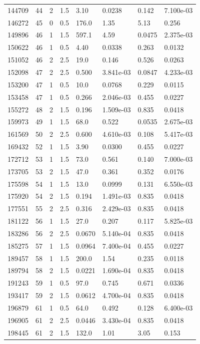 \documentclass[preview]{standalone}
\begin{document}
{{{\begin{tabular}{L{1.2cm}C{1.2cm} C{0.3cm}C{0.5cm} C{1.4cm}C{1.4cm} C{1.4cm}C{1.4cm}}
  144709  &    44  & 2     & 1.5 &  3.10  & 0.0238  & 0.142 &  7.100e-03   \\ 
  146272  &    45  & 0     & 0.5 &  176.0  & 1.35  & 5.13 &  0.256   \\ 
  149896  &    46  & 1     & 1.5 &  597.1  & 4.59  & 0.0475 &  2.375e-03   \\ 
  150622  &    46  & 1     & 0.5 &  4.40  & 0.0338  & 0.263 &  0.0132   \\ 
  151052  &    46  & 2     & 2.5 &  19.0  & 0.146  & 0.526 &  0.0263   \\ 
  152098  &    47  & 2     & 2.5 &  0.500  & 3.841e-03  & 0.0847 &  4.233e-03   \\ 
  153200  &    47  & 1     & 0.5 &  10.0  & 0.0768  & 0.229 &  0.0115   \\ 
  153458  &    47  & 1     & 0.5 &  0.266  & 2.046e-03  & 0.455 &  0.0227   \\ 
  155272  &    48  & 2     & 1.5 &  0.196  & 1.509e-03  & 0.835 &  0.0418   \\ 
  159973  &    49  & 1     & 1.5 &  68.0  & 0.522  & 0.0535 &  2.675e-03   \\ 
  161569  &    50  & 2     & 2.5 &  0.600  & 4.610e-03  & 0.108 &  5.417e-03   \\ 
  169432  &    52  & 1     & 1.5 &  3.90  & 0.0300  & 0.455 &  0.0227   \\ 
  172712  &    53  & 1     & 1.5 &  73.0  & 0.561  & 0.140 &  7.000e-03   \\ 
  173705  &    53  & 2     & 1.5 &  47.0  & 0.361  & 0.352 &  0.0176   \\ 
  175598  &    54  & 1     & 1.5 &  13.0  & 0.0999  & 0.131 &  6.550e-03   \\ 
  175920  &    54  & 2     & 1.5 &  0.194  & 1.491e-03  & 0.835 &  0.0418   \\ 
  177551  &    55  & 2     & 2.5 &  0.316  & 2.429e-03  & 0.835 &  0.0418   \\ 
  181122  &    56  & 1     & 1.5 &  27.0  & 0.207  & 0.117 &  5.825e-03   \\ 
  183286  &    56  & 2     & 2.5 &  0.0670  & 5.140e-04  & 0.835 &  0.0418   \\ 
  185275  &    57  & 1     & 1.5 &  0.0964  & 7.400e-04  & 0.455 &  0.0227   \\ 
  189457  &    58  & 1     & 1.5 &  200.0  & 1.54  & 0.235 &  0.0118   \\ 
  189794  &    58  & 2     & 1.5 &  0.0221  & 1.690e-04  & 0.835 &  0.0418   \\ 
  191243  &    59  & 1     & 0.5 &  97.0  & 0.745  & 0.671 &  0.0336   \\ 
  193417  &    59  & 2     & 1.5 &  0.0612  & 4.700e-04  & 0.835 &  0.0418   \\ 
  196879  &    61  & 1     & 0.5 &  64.0  & 0.492  & 0.128 &  6.400e-03   \\ 
  196905  &    61  & 2     & 2.5 &  0.0446  & 3.430e-04  & 0.835 &  0.0418   \\ 
  198445  &    61  & 2     & 1.5 &  132.0  & 1.01  & 3.05 &  0.153   \\ 
\hline 
\end{tabular} 

}}}
\end{document}
